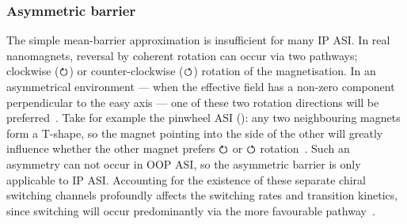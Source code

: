 \subsubsection{Asymmetric barrier}
The simple mean-barrier approximation is insufficient for many IP ASI.
In real nanomagnets, reversal by coherent rotation can occur via two pathways; clockwise ($\boldsymbol{\circlearrowright}$) or counter-clockwise ($\boldsymbol{\circlearrowleft}$) rotation of the magnetisation.
In an asymmetrical environment --- when the effective field has a non-zero component perpendicular to the easy axis --- one of these two rotation directions will be preferred~\cite{leo2021chiral,DirectionalEnergyBarrier}.
Take for example the pinwheel ASI (): any two neighbouring magnets form a T-shape, so the magnet pointing into the side of the other will greatly influence whether the other magnet prefers $\boldsymbol{\circlearrowright}$ or $\boldsymbol{\circlearrowleft}$ rotation~\cite{DirectionalEnergyBarrier}. %
Such an asymmetry can not occur in OOP ASI, so the asymmetric barrier is only applicable to IP ASI.
Accounting for the existence of these separate chiral switching channels profoundly affects the switching rates and transition kinetics, since switching will occur predominantly via the more favourable pathway~\cite{leo2021chiral}. \\\par

